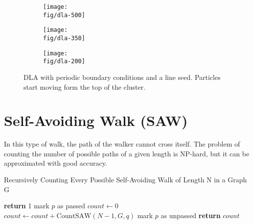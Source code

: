 \documentclass[12pt,a4paper]{article}
\newcommand{\fig}{../fig}
\begin{document}
	\begin{figure}[htb!]
		\centering
		\begin{subfigure}{\linewidth}
			\centering
			\texttt{[image: \\fig/dla-500]}
		\end{subfigure}
		\begin{subfigure}{\linewidth}
			\centering
			\texttt{[image: \\fig/dla-350]}
		\end{subfigure}
		\begin{subfigure}{\linewidth}
			\centering
			\texttt{[image: \\fig/dla-200]}
		\end{subfigure}
		\caption{DLA with periodic boundary conditions and a line seed.
			Particles start moving form the top of the cluster.}
	\end{figure}
	
	\section{Self-Avoiding Walk (SAW)}
	In this type of walk, the path of the walker cannot cross itself. The problem of counting the number of possible
	paths of a given length is NP-hard, but it can be approximated with good accuracy.

	\begin{algorithm}
        \caption{Recursively Counting Every Possible Self-Avoiding Walk of Length N in a Graph G}
        \begin{algorithmic}[1]
             
					\textbf{return} 1
				\Else
					\State mark $p$ as passed
					\State $count \gets 0$
							\State $count \gets count + \mathrm{CountSAW}(N - 1, G, q)$ 
						\EndIf
					\EndFor
					\State mark $p$ as unpassed
					\State \textbf{return} $count$
				\EndIf
            \EndFunction
        \end{algorithmic}
    \end{algorithm}
\end{document}
